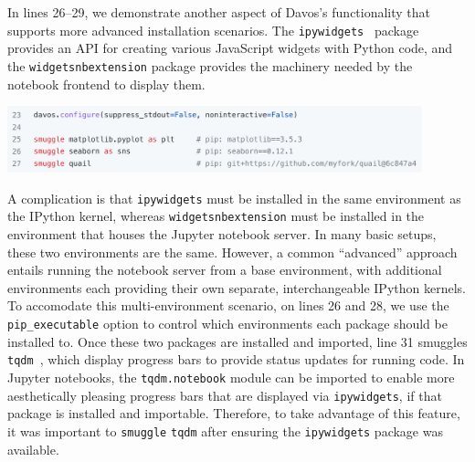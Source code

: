 \documentclass[preprint,12pt,a4paper]{elsarticle}
\begin{document}
In lines 26--29, we demonstrate another aspect of Davos's
functionality that supports more advanced installation scenarios.  The
\texttt{ipywidgets}~\cite{FredEtal15} package provides an API for
creating various JavaScript widgets with Python code, and the \texttt{widgetsnbextension} package provides
the machinery needed by the notebook frontend to display them.
\begin{center}
\includegraphics[width=0.9\textwidth]{figs/example6}
\end{center}
A complication is that \texttt{ipywidgets} must be installed in the
same environment as the IPython kernel, whereas
\texttt{widgetsnbextension} must be installed in the environment that
houses the Jupyter notebook server. In many basic setups, these two
environments are the same.  However, a common ``advanced'' approach
entails running the notebook server from a base environment, with
additional environments each providing their own separate,
interchangeable IPython kernels.  To accomodate this multi-environment
scenario, on lines 26 and 28, we use the \texttt{pip\_executable} option to control which environments each
package should be installed to.  Once these two packages are installed
and imported, line 31 smuggles \texttt{tqdm}~\cite{daCoEtal22}, which
display progress bars to provide status updates for running code. In
Jupyter notebooks, the \texttt{tqdm.notebook} module can be imported
to enable more aesthetically pleasing progress bars that are displayed via
\texttt{ipywidgets}, if that package is installed and
importable. Therefore, to take advantage of this feature, it was
important to \texttt{smuggle} \texttt{tqdm} after ensuring the
\texttt{ipywidgets} package was available.
\end{document}
